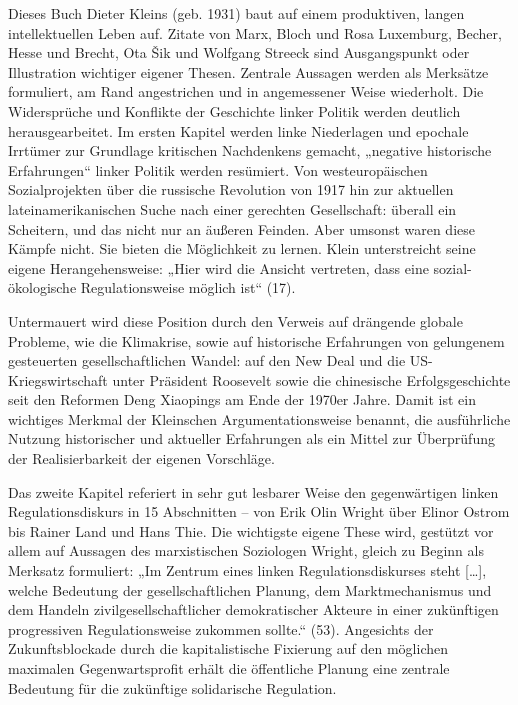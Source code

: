 \begin{multicols*}{2}
    Dieses Buch Dieter Kleins (geb. 1931) baut auf einem produktiven, langen intellektuellen Leben auf. Zitate von Marx, Bloch und Rosa Luxemburg, Becher, Hesse und Brecht, Ota Šik und Wolfgang Streeck sind Ausgangspunkt oder Illustration wichtiger eigener Thesen. Zentrale Aussagen werden als Merksätze formuliert, am Rand angestrichen und in angemessener Weise wiederholt. Die Widersprüche und Konflikte der Geschichte linker Politik werden deutlich herausgearbeitet. Im ersten Kapitel werden linke Niederlagen und epochale Irrtümer zur Grundlage kritischen Nachdenkens gemacht, „negative historische Erfahrungen“ linker Politik werden resümiert. Von westeuropäischen Sozialprojekten über die russische Revolution von 1917 hin zur aktuellen lateinamerikanischen Suche nach einer gerechten Gesellschaft: überall ein Scheitern, und das nicht nur an äußeren Feinden. Aber umsonst waren diese Kämpfe nicht. Sie bieten die Möglichkeit zu lernen. Klein unterstreicht seine eigene Herangehensweise: „Hier wird die Ansicht vertreten, dass eine sozial-ökologische Regulationsweise möglich ist“ (17).

    Untermauert wird diese Position durch den Verweis auf drängende globale Probleme, wie die Klimakrise, sowie auf historische Erfahrungen von gelungenem gesteuerten gesellschaftlichen Wandel: auf den New Deal und die US-Kriegswirtschaft unter Präsident Roosevelt sowie die chinesische Erfolgsgeschichte seit den Reformen Deng Xiaopings am Ende der 1970er Jahre. Damit ist ein wichtiges Merkmal der Kleinschen Argumentationsweise benannt, die ausführliche Nutzung historischer und aktueller Erfahrungen als ein Mittel zur Überprüfung der Realisierbarkeit der eigenen Vorschläge. 

    Das zweite Kapitel referiert in sehr gut lesbarer Weise den gegenwärtigen linken Regulationsdiskurs in 15 Abschnitten – von Erik Olin Wright über Elinor Ostrom bis Rainer Land und Hans Thie. Die wichtigste eigene These wird, gestützt vor allem auf Aussagen des marxistischen Soziologen Wright, gleich zu Beginn als Merksatz formuliert: „Im Zentrum eines linken Regulationsdiskurses steht […], welche Bedeutung der gesellschaftlichen Planung, dem Marktmechanismus und dem Handeln zivilgesellschaftlicher demokratischer Akteure in einer zukünftigen progressiven Regulationsweise zukommen sollte.“ (53). Angesichts der Zukunftsblockade durch die kapitalistische Fixierung auf den möglichen maximalen Gegenwartsprofit erhält die öffentliche Planung eine zentrale Bedeutung für die zukünftige solidarische Regulation.


\end{multicols*}

